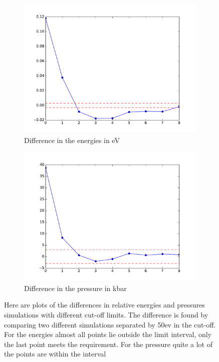 \documentclass[a4paper,10pt]{article}
\begin{document}
  \begin{figure}[h]
  	\begin{center}
  		\begin{subfigure}{0.4\textwidth}
  			\includegraphics[width=1.0\linewidth]{energyDiff.pdf} 
  			\caption{Difference in the energies in eV}
  			\label{fig:subim1}
  		\end{subfigure}
  		\begin{subfigure}{0.4\textwidth}
  			\includegraphics[width=1.0\linewidth]{pressDiff.pdf}
  			\caption{Difference in the pressure in kbar}
  			\label{fig:subim2}
  		\end{subfigure}
  		
  		\caption{Here are plots of the differences in relative energies and pressures simulations with different cut-off limits. The difference is found by comparing two different simulations separated by 50ev in the cut-off. For the energies almost all points lie outside the limit interval, only the last point meets the requirement. For the pressure quite a lot of the points are within the interval}
  		\label{fig:image2}
  	\end{center}
  \end{figure}
\end{document}
